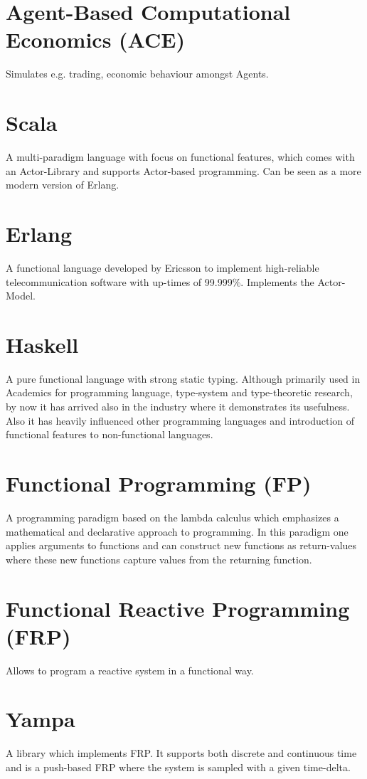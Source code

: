 \documentclass[oneside]{book}
\begin{document}
\section*{Agent-Based Computational Economics (ACE)}
Simulates e.g. trading, economic behaviour amongst Agents.

\section*{Scala}
A multi-paradigm language with focus on functional features, which comes with an Actor-Library and supports Actor-based programming. Can be seen as a more modern version of Erlang.

\section*{Erlang}
A functional language developed by Ericsson to implement high-reliable telecommunication software with up-times of 99.999\%. Implements the Actor-Model.

\section*{Haskell}
A pure functional language with strong static typing. Although primarily used in Academics for programming language, type-system and type-theoretic research, by now it has arrived also in the industry where it demonstrates its usefulness. Also it has heavily influenced other programming languages and introduction of functional features to non-functional languages.

\section*{Functional Programming (FP)}
A programming paradigm based on the lambda calculus which emphasizes a mathematical and declarative approach to programming. In this paradigm one applies arguments to functions and can construct new functions as return-values where these new functions capture values from the returning function.

\section*{Functional Reactive Programming (FRP)}
Allows to program a reactive system in a functional way.

\section*{Yampa}
A library which implements FRP. It supports both discrete and continuous time and is a push-based FRP where the system is sampled with a given time-delta.
\end{document}
